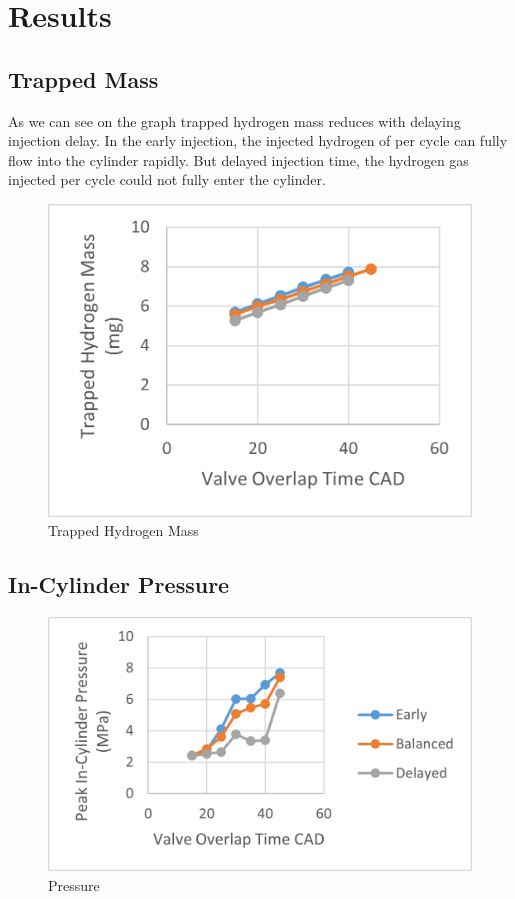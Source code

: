 \documentclass[conference]{IEEEtran}
\begin{document}
\section{Results}
\subsection{Trapped Mass}
As we can see on the graph trapped hydrogen mass reduces with delaying injection delay. In the early injection, the injected hydrogen of per cycle can fully flow into the cylinder rapidly. But delayed injection time, the hydrogen gas injected per cycle could not fully enter the cylinder. 

\begin{figure}[htbp]
    \centerline{\includegraphics{Plots/trapped mass.png}}
    \caption{Trapped Hydrogen Mass}
    \label{plt_1}
    \end{figure}

\subsection{In-Cylinder Pressure}
\begin{figure}[htbp]
    \centerline{\includegraphics{Plots/pressure.png}}
    \caption{Pressure}
    \label{plt_2}
    \end{figure}
\end{document}
